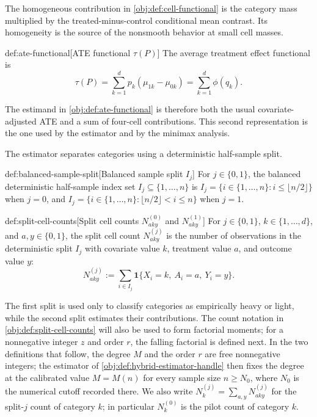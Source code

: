 The homogeneous contribution  in \cref{obj:def:cell-functional} is the category mass multiplied by the treated-minus-control conditional mean contrast. Its homogeneity is the source of the nonsmooth behavior at small cell masses.

\begin{definitionv}{def:ate-functional}[ATE functional \(\tau(P)\)]
The average treatment effect functional is
\[
\tau(P)
=
\sum_{k=1}^{d}p_k(\mu_{1k}-\mu_{0k})
=
\sum_{k=1}^{d}\phi(q_k).
\]
\end{definitionv}

The estimand  in \cref{obj:def:ate-functional} is therefore both the usual covariate-adjusted ATE and a sum of four-cell contributions. This second representation is the one used by the estimator and by the minimax analysis.

The estimator separates categories using a deterministic half-sample split.

\begin{definitionv}{def:balanced-sample-split}[Balanced sample split $I_j$]
For $j\in\{0,1\}$, the balanced deterministic half-sample index set $I_j\subseteq\{1,\ldots,n\}$ is $I_j=\{i\in\{1,\ldots,n\}: i\le \lfloor n/2\rfloor\}$ when $j=0$, and $I_j=\{i\in\{1,\ldots,n\}: \lfloor n/2\rfloor<i\le n\}$ when $j=1$.
\end{definitionv}

\begin{definitionv}{def:split-cell-counts}[Split cell counts $N^{(0)}_{aky}$ and $N^{(1)}_{aky}$]
For $j\in\{0,1\}$, $k\in\{1,\ldots,d\}$, and $a,y\in\{0,1\}$, the split cell count $N^{(j)}_{aky}$ is the number of observations in the deterministic split $I_j$ with covariate value $k$, treatment value $a$, and outcome value $y$: \[N^{(j)}_{aky}:=\sum_{i\in I_j}\mathbf 1\{X_i=k,\ A_i=a,\ Y_i=y\}.\]
\end{definitionv}

The first split is used only to classify categories as empirically heavy or light, while the second split estimates their contributions. The count notation  in \cref{obj:def:split-cell-counts} will also be used to form factorial moments; for a nonnegative integer \(z\) and order \(r\), the falling factorial  is defined next. In the two definitions that follow, the degree \(M\) and the order \(r\) are free nonnegative integers; the estimator of \cref{obj:def:hybrid-estimator-handle} then fixes the degree at the calibrated value \(M=M(n)\) for every sample size \(n\ge N_0\), where \(N_0\) is the numerical cutoff recorded there. We also write \(N^{(j)}_{k}=\sum_{a,y}N^{(j)}_{aky}\) for the split-\(j\) count of category \(k\); in particular \(N^{(0)}_{k}\) is the pilot count of category \(k\).

